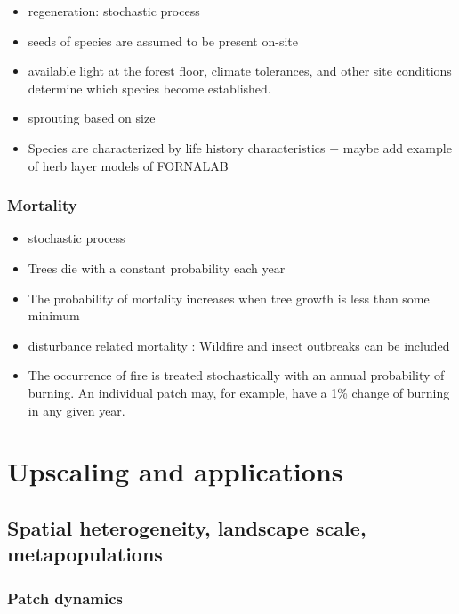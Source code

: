 \documentclass[
  oneside]{book}
\begin{document}
\begin{itemize}
\item
  regeneration: stochastic process
\item
  seeds of species are assumed to be present on-site
\item
  available light at the forest floor, climate tolerances, and other site conditions determine which species become established.
\item
  sprouting based on size
\item
  Species are characterized by life history characteristics + maybe add example of herb layer models of FORNALAB
\end{itemize}

\hypertarget{mortality}{%
\section{Mortality}\label{mortality}}

\begin{itemize}
\item
  stochastic process
\item
  Trees die with a constant probability each year
\item
  The probability of mortality increases when tree growth is less than some minimum
\item
  disturbance related mortality : Wildfire and insect outbreaks can be included
\item
  The occurrence of fire is treated stochastically with an annual probability of burning. An individual patch may, for example, have a 1\% change of burning in any given year.
\end{itemize}

\hypertarget{part-upscaling-and-applications}{%
\part{Upscaling and applications}\label{part-upscaling-and-applications}}

\hypertarget{spatial-heterogeneity-landscape-scale-metapopulations}{%
\chapter{Spatial heterogeneity, landscape scale, metapopulations}\label{spatial-heterogeneity-landscape-scale-metapopulations}}


\hypertarget{patch-dynamics}{%
\section{Patch dynamics}\label{patch-dynamics}}
\end{document}
